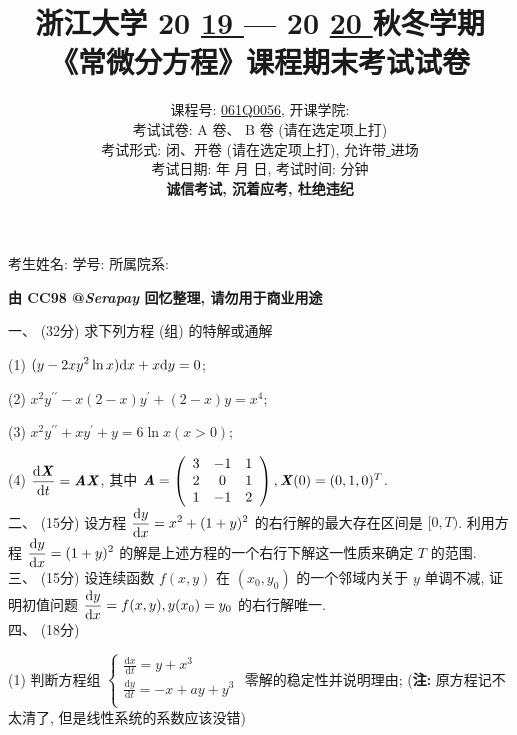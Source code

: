 \documentclass[UTF8]{ctexart}
\title{
\textbf{浙江大学 }20 \underline{ 19 } — 20 \underline{ 20 } \textbf{秋冬学期} \\
\textbf{《常微分方程》课程期末考试试卷}
}
\author{
课程号: \underline{ \quad061Q0056\quad }, 开课学院: \underline{ \quad数学科学学院\quad } \\
考试试卷: \checkmark A 卷、 B 卷 (请在选定项上打\checkmark) \\
考试形式: \checkmark 闭、开卷 (请在选定项上打\checkmark), 允许带\underline{ \quad无\quad  }进场 \\
考试日期: \underline{ \quad2020\quad } 年 \underline{ \quad01\quad } 月 \underline{ \quad09\quad } 日, 考试时间: \underline{ \quad120\quad }分钟 \\
\textbf{诚信考试, 沉着应考, 杜绝违纪}
}
\date{}
\begin{document}
\maketitle
\begin{center}
考生姓名: \underline{\quad\quad\quad\quad\quad\quad\quad\quad\quad} 学号: \underline{\quad\quad\quad\quad\quad\quad\quad\quad\quad} 所属院系: \underline{\quad\quad\quad\quad\quad\quad\quad\quad\quad}
\end{center}

\begin{center}
    \Large{\textbf{由 CC98 @\textit{Serapay} 回忆整理, 请勿用于商业用途}}
\end{center}

一、 (32分) 求下列方程 (组) 的特解或通解

(1) $\displaystyle(y-2xy^2\ln x){\rm d}x+x{\rm d}y=0$;

(2) $\displaystyle x^2y^{\prime\prime}-x(2-x)y^{\prime}+(2-x)y=x^4$;

(3) $x^2y^{\prime\prime}+xy^{\prime}+y=6\ln x(x>0)$;

(4) $\displaystyle\frac{{\rm d}\textbf{\textit{X}}}{{\rm d}t}=\textbf{\textit{AX}}$, 其中 $\textbf{\textit{A}}=
\left(\begin{array}{ccc}
3 & -1 & 1 \\
2 & 0 & 1 \\
1 & -1 & 2
\end{array}\right),\textbf{\textit{X}}(0)=(0,1,0)^T$.
\\

二、 (15分) 设方程 $\displaystyle\frac{{\rm d}y}{{\rm d}x}=x^2+(1+y)^2$ 的右行解的最大存在区间是 $[0,T)$. 利用方程 $\displaystyle\frac{{\rm d}y}{{\rm d}x}=(1+y)^2$ 的解是上述方程的一个右行下解这一性质来确定 $T$ 的范围.
\\

三、 (15分) 设连续函数 $f(x,y)$ 在 $(x_0,y_0)$ 的一个邻域内关于 $y$ 单调不减, 证明初值问题 $\displaystyle\frac{{\rm d}y}{{\rm d}x}=f(x,y), y(x_0)=y_0$ 的右行解唯一.
\\

四、 (18分)

(1) 判断方程组 $\begin{cases}
	\displaystyle\frac{\text{d}x}{\text{d}t}=y+x^3\\
	\displaystyle\frac{\text{d}y}{\text{d}t}=-x+ay+y^3\\
    \end{cases}$ 零解的稳定性并说明理由; (\textbf{注:} 原方程记不太清了, 但是线性系统的系数应该没错)
\end{document}
